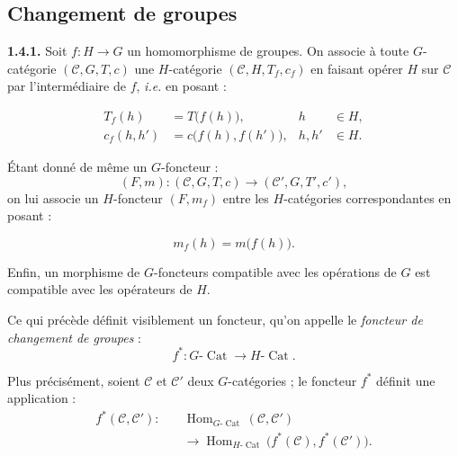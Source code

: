 %
\subsection{Changement de groupes}

\noindent\textbf{1.4.1.}\quad
Soit $f\colon H\to G$ un homomorphisme de groupes. On associe à toute
$G$-catégorie $(\mathcal C,G,T,c)$ une $H$-catégorie
$(\mathcal C,H,T_f,c_f)$ en faisant opérer $H$ sur $\mathcal C$ par
l'intermédiaire de $f$, \emph{i.e.} en posant :

\begin{equation}
  \begin{aligned}
    T_f(h)&=T\bigl(f(h)\bigr),
      & h&\in H,\\
    c_f(h,h')&=c\bigl(f(h),f(h')\bigr),
      & h,h'&\in H.
  \end{aligned}
  \tag{1.4.1.1}
\end{equation}

Étant donné de même un $G$-foncteur :
\[
  (F,m)\colon(\mathcal C,G,T,c)
  \longrightarrow(\mathcal C',G,T',c'),
\]
on lui associe un $H$-foncteur $(F,m_f)$ entre les $H$-catégories
correspondantes en posant :

\begin{equation}
  m_f(h)=m\bigl(f(h)\bigr).
  \tag{1.4.1.2}
\end{equation}

Enfin, un morphisme de $G$-foncteurs compatible avec les opérations de
$G$ est compatible avec les opérateurs de $H$.

Ce qui précède définit visiblement un foncteur, qu'on appelle le
\emph{foncteur de changement de groupes} :
\begin{equation}
  f^*\colon G\text{-}\operatorname{Cat}
  \longrightarrow H\text{-}\operatorname{Cat}.
  \tag{1.4.1.3}
\end{equation}

Plus précisément, soient $\mathcal C$ et $\mathcal C'$ deux
$G$-catégories ; le foncteur $f^*$ définit une application :
\begin{equation}
  \begin{aligned}
    f^*(\mathcal C,\mathcal C')\colon\quad
      &\operatorname{Hom}_{G\text{-}\operatorname{Cat}}
        (\mathcal C,\mathcal C')\\
      &\longrightarrow
        \operatorname{Hom}_{H\text{-}\operatorname{Cat}}
        \bigl(f^*(\mathcal C),f^*(\mathcal C')\bigr).
  \end{aligned}
  \tag{1.4.1.4}
\end{equation}

